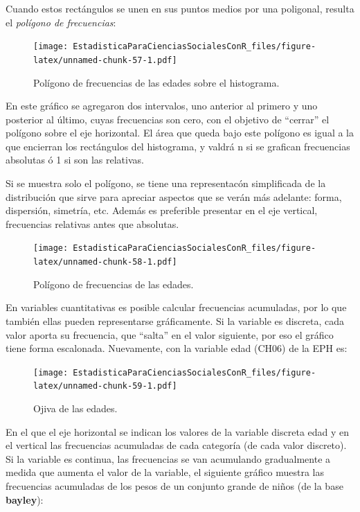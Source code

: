 \documentclass[]{book}
\begin{document}
Cuando estos rectángulos se unen en sus puntos medios por una poligonal, resulta el \emph{polígono de frecuencias}:

\begin{figure}
\centering
\texttt{[image: EstadisticaParaCienciasSocialesConR\_files/figure-latex/unnamed-chunk-57-1.pdf]}
\caption{\label{fig:unnamed-chunk-57}Polígono de frecuencias de las edades sobre el histograma.}
\end{figure}

En este gráfico se agregaron dos intervalos, uno anterior al primero y uno posterior al último, cuyas frecuencias son cero, con el objetivo de ``cerrar'' el polígono sobre el eje horizontal.
El área que queda bajo este polígono es igual a la que encierran los rectángulos del histograma, y valdrá n si se grafican frecuencias absolutas ó 1 si son las relativas.

Si se muestra solo el polígono, se tiene una representacón simplificada de la distribución que sirve para apreciar aspectos que se verán más adelante: forma, dispersión, simetría, etc. Además es preferible presentar en el eje vertical, frecuencias relativas antes que absolutas.

\begin{figure}
\centering
\texttt{[image: EstadisticaParaCienciasSocialesConR\_files/figure-latex/unnamed-chunk-58-1.pdf]}
\caption{\label{fig:unnamed-chunk-58}Polígono de frecuencias de las edades.}
\end{figure}

En variables cuantitativas es posible calcular frecuencias acumuladas, por lo que también ellas pueden representarse gráficamente. Si la variable es discreta, cada valor aporta su frecuencia, que ``salta'' en el valor siguiente, por eso el gráfico tiene forma escalonada. Nuevamente, con la variable edad (CH06) de la EPH es:

\begin{figure}
\centering
\texttt{[image: EstadisticaParaCienciasSocialesConR\_files/figure-latex/unnamed-chunk-59-1.pdf]}
\caption{\label{fig:unnamed-chunk-59}Ojiva de las edades.}
\end{figure}

En el que el eje horizontal se indican los valores de la variable discreta edad y en el vertical las frecuencias acumuladas de cada categoría (de cada valor discreto).
Si la variable es continua, las frecuencias se van acumulando gradualmente a medida que aumenta el valor de la variable, el siguiente gráfico muestra las frecuencias acumuladas de los pesos de un conjunto grande de niños (de la base \textbf{bayley}):
\end{document}
